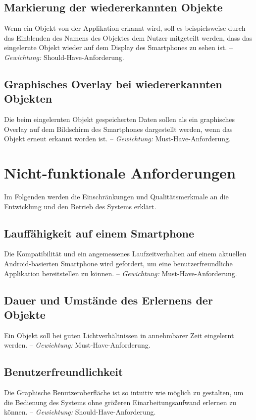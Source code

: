 \documentclass[oneside]{ausarbeitung}
\begin{document}
\subsection{Markierung der wiedererkannten Objekte}
Wenn ein Objekt von der Applikation erkannt wird, soll es beispielsweise durch das Einblenden des Namens des Objektes dem Nutzer mitgeteilt werden, dass das eingelernte Objekt wieder auf dem Display des Smartphones zu sehen ist. -- \textit{Gewichtung:} Should-Have-Anforderung.
\subsection{Graphisches Overlay bei wiedererkannten Objekten}
Die beim eingelernten Objekt gespeicherten Daten sollen als ein graphisches Overlay auf dem Bildschirm des Smartphones dargestellt werden, wenn das Objekt erneut erkannt worden ist. -- \textit{Gewichtung:} Must-Have-Anforderung.

%
\section{Nicht-funktionale Anforderungen}
Im Folgenden werden die Einschränkungen und Qualitätsmerkmale an die Entwicklung und den Betrieb des Systems erklärt.

\subsection{Lauffähigkeit auf einem Smartphone}
Die Kompatibilität und ein angemessenes Laufzeitverhalten auf einem aktuellen Android-basierten Smartphone wird gefordert, um eine benutzerfreundliche Applikation bereitstellen zu können. -- \textit{Gewichtung:} Must-Have-Anforderung.

\subsection{Dauer und Umstände des Erlernens der Objekte}
Ein Objekt soll bei guten Lichtverhältnissen in annehmbarer Zeit eingelernt werden. -- \textit{Gewichtung:} Must-Have-Anforderung.

\subsection{Benutzerfreundlichkeit}
Die Graphische Benutzeroberfläche ist so intuitiv wie möglich zu gestalten, um die Bedienung des Systems ohne größeren Einarbeitungsaufwand erlernen zu können. -- \textit{Gewichtung:} Should-Have-Anforderung.
\end{document}
